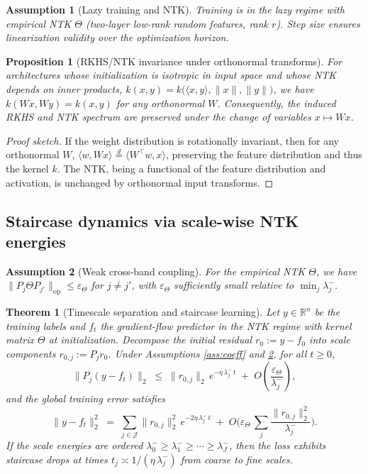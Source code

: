 \documentclass[11pt]{article}
\newtheorem{assumption}{Assumption}
\newtheorem{theorem}{Theorem}
\newtheorem{proposition}{Proposition}
\theoremstyle{remark}
\begin{document}
\begin{assumption}[Lazy training and NTK]\label{ass:lazy}
Training is in the lazy regime with empirical NTK $\Theta$ (two-layer low-rank random features, rank $r$). Step size ensures linearization validity over the optimization horizon.
\end{assumption}

\begin{proposition}[RKHS/NTK invariance under orthonormal transforms]\label{prop:rkhs-invariance}
For architectures whose initialization is isotropic in input space and whose NTK depends on inner products, $k(x,y)=k\big(\langle x,y\rangle, \|x\|,\|y\|\big)$, we have $k(Wx,Wy)=k(x,y)$ for any orthonormal $W$. Consequently, the induced RKHS and NTK spectrum are preserved under the change of variables $x \mapsto Wx$.
\end{proposition}

\begin{proof}[Proof sketch]
If the weight distribution is rotationally invariant, then for any orthonormal $W$, $\langle w,Wx\rangle \stackrel{d}{=} \langle W^\top w, x\rangle$, preserving the feature distribution and thus the kernel $k$. The NTK, being a functional of the feature distribution and activation, is unchanged by orthonormal input transforms.
\end{proof}

\subsection{Staircase dynamics via scale-wise NTK energies}

\begin{assumption}[Weak cross-band coupling]\label{ass:weak-coupling}
For the empirical NTK $\Theta$, we have $\|P_j \Theta P_{j'}\|_{\mathrm{op}} \le \varepsilon_\Theta$ for $j \ne j'$, with $\varepsilon_\Theta$ sufficiently small relative to $\min_j \lambda_j^{-}$.
\end{assumption}

\begin{theorem}[Timescale separation and staircase learning]\label{thm:staircase}
Let $y \in \mathbb{R}^n$ be the training labels and $f_t$ the gradient-flow predictor in the NTK regime with kernel matrix $\Theta$ at initialization. Decompose the initial residual $r_0 := y-f_0$ into scale components $r_{0,j} := P_j r_0$. Under Assumptions \ref{ass:coeff} and \ref{ass:weak-coupling}, for all $t \ge 0$,
\[
\|P_j (y - f_t)\|_2 \;\le\; \|r_{0,j}\|_2\, e^{-\eta\, \lambda_j^{-}\, t} \;+\; O\!\left(\frac{\varepsilon_\Theta}{\lambda_j^{-}}\right),
\]
and the global training error satisfies
\[
\|y-f_t\|_2^2 \;=\; \sum_{j \in \mathcal{J}} \|r_{0,j}\|_2^2\, e^{-2\eta\, \lambda_j^{-}\, t} \;+\; O\!\Big(\varepsilon_\Theta\,\sum_{j} \frac{\|r_{0,j}\|_2^2}{\lambda_j^{-}}\Big).
\]
If the scale energies are ordered $\lambda_0^{-} \ge \lambda_1^{-} \ge \cdots \ge \lambda_J^{-}$, then the loss exhibits staircase drops at times $t_j \asymp 1/(\eta\,\lambda_j^{-})$ from coarse to fine scales.
\end{theorem}
\end{document}
